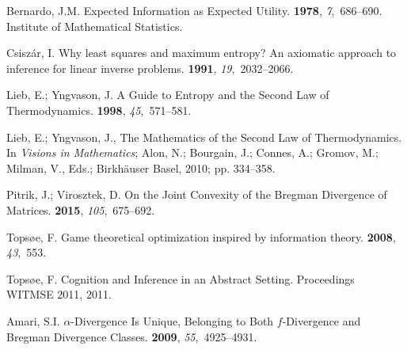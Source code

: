 \documentclass[10pt,a4paper,draft]{article}
\begin{document}
\begin{thebibliography}{-------}
Bernardo, J.M.
\newblock Expected Information as Expected Utility.
 {\bf 1978}, {\em 7},~686--690.
\newblock Institute of Mathematical Statistics.

Csisz{\'a}r, I.
\newblock Why least squares and maximum entropy? An axiomatic approach to
  inference for linear inverse problems.
 {\bf 1991}, {\em 19},~2032--2066.

Lieb, E.; Yngvason, J.
\newblock A Guide to Entropy and the Second Law of Thermodynamics.
 {\bf 1998}, {\em 45},~571--581.

Lieb, E.; Yngvason, J., The Mathematics of the Second Law of Thermodynamics.
\newblock In {\em Visions in Mathematics}; Alon, N.; Bourgain, J.; Connes, A.;
  Gromov, M.; Milman, V., Eds.; Birkh{\"a}user Basel,  2010; pp. 334--358.

Pitrik, J.; Virosztek, D.
\newblock On the Joint Convexity of the Bregman Divergence of Matrices.
 {\bf 2015}, {\em
  105},~675--692.

Tops{\o}e, F.
\newblock Game theoretical optimization inspired by information theory.
 {\bf 2008}, {\em 43},~553.

Tops{\o}e, F.
\newblock Cognition and Inference in an Abstract Setting.
\newblock  Proceedings WITMSE 2011,  2011.

Amari, S.I.
\newblock $\alpha$-Divergence Is Unique, Belonging to Both $f$-Divergence and
  Bregman Divergence Classes.
 {\bf 2009}, {\em
  55},~4925--4931.

\end{thebibliography}


%
%



\end{document}
